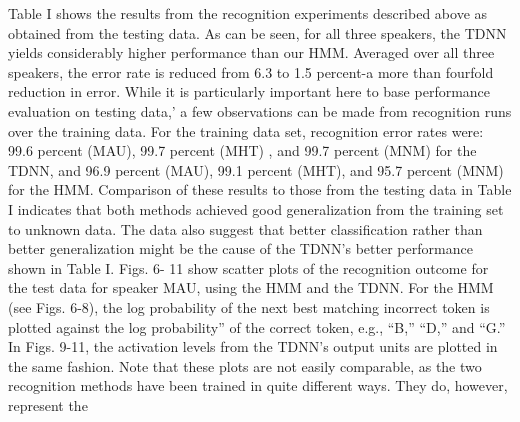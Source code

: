 Table I shows the results from the recognition experiments described above as obtained from the testing data.
As can be seen, for all three speakers, the TDNN yields considerably higher performance than our HMM. 
Averaged over all three speakers, the error rate is reduced from 6.3 to 1.5 percent-a more than fourfold reduction in error.
While it is particularly important here to base performance evaluation on testing data,’ a few observations can be made from recognition runs over the training data.
For the training data set, recognition error rates were: 99.6 percent (MAU), 99.7 percent (MHT) , and 99.7 percent (MNM) for the TDNN, and 96.9 percent (MAU), 99.1 percent (MHT), and 95.7 percent (MNM) for the HMM.
Comparison of these results to those from the testing data in Table I indicates that both methods achieved good generalization from the training set to unknown data. 
The data also suggest that better classification rather than better generalization might be the cause of the TDNN’s better performance shown in Table I.
Figs. 6- 11 show scatter plots of the recognition outcome for the test data for speaker MAU, using the HMM and the TDNN. For the HMM (see Figs. 6-8), the log probability of the next best matching incorrect token is plotted against the log probability” of the correct token, e.g., “B,” “D,” and “G.” In Figs. 9-11, the activation levels from the TDNN’s output units are plotted in the same fashion. 
Note that these plots are not easily comparable, as the two recognition methods have been trained in quite different ways. 
They do, however, represent the



